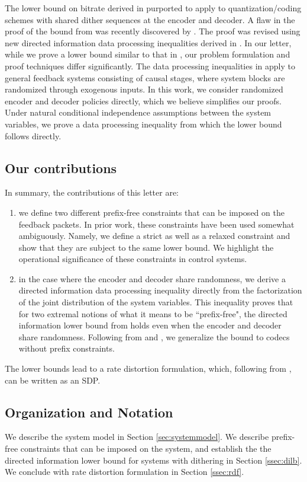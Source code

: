 \documentclass[letterpaper, 10 pt, conference]{ieeeconf}  %
\newcounter{constraint}[section]
\begin{document}
The lower bound on bitrate derived in  \cite{silvaFirst} purported to apply to quantization/coding schemes with shared dither sequences at the encoder and decoder. A flaw in the proof of the bound from \cite{silvaFirst} was recently discovered by \cite{milanCorrection}. The proof was revised using new directed information data processing inequalities derived in \cite{milanMainResult}. In our letter, while we prove a lower bound similar to that in \cite{milanCorrection}, our problem formulation and proof techniques differ significantly. The data processing inequalities in \cite{milanMainResult} apply to general feedback systems consisting of causal stages, where system blocks are randomized through exogenous inputs. In this work, we consider randomized encoder and decoder policies directly, which we believe simplifies our proofs. Under natural conditional independence assumptions between the system variables, we prove a data processing inequality from which the lower bound follows directly. 
\subsection{Our contributions}
In summary, the contributions of this letter are:
\begin{enumerate}
    \item we define two different prefix-free constraints that can be imposed on the feedback packets. In prior work, these constraints have been used somewhat ambiguously. Namely, we define a strict as well as a relaxed constraint and show that they are subject to the same lower bound. We highlight the operational significance of these constraints in control systems. 
    \item in the case where the encoder and decoder share randomness, we derive a directed information data processing inequality directly from the factorization of the joint distribution of the system variables. This inequality proves that for two extremal notions of what it means to be ``prefix-free", the directed information lower bound from \cite{tanakaISIT} holds even when the encoder and decoder share randomness. Following from \cite{kostinaTradeoff} and \cite{verduVariableLength}, we generalize the bound to codecs without prefix constraints.
\end{enumerate}
 The lower bounds lead to a rate distortion formulation, which, following from \cite{SDP_DI}, can be written as an SDP.
\subsection{Organization and Notation} We describe the system model in Section \ref{sec:systemmodel}. We describe prefix-free constraints that can be imposed on the system, and establish the the directed information lower bound for systems with dithering in Section \ref{ssec:dilb}. We conclude with  rate distortion formulation in  Section \ref{ssec:rdf}. 
\end{document}

